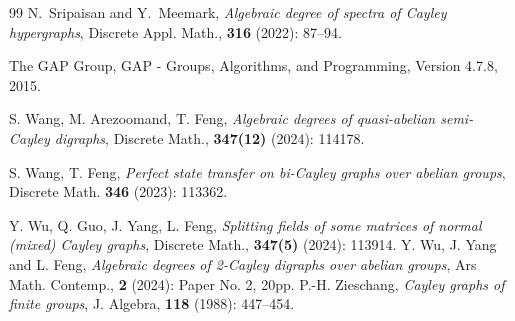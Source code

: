 \documentclass[12pt,a4paper]{article}
\begin{document}
\begin{thebibliography}{99}
		N.~Sripaisan and Y.~Meemark, {\it Algebraic degree of spectra of Cayley hypergraphs}, Discrete Appl. Math., {\bf 316} (2022): 87--94.
		
		
			The GAP Group, GAP - Groups, Algorithms, and Programming, Version 4.7.8, 2015.
		
		S. Wang, M. Arezoomand, T. Feng, {\it Algebraic degrees of quasi-abelian semi-Cayley digraphs}, Discrete Math., {\bf 347(12)} (2024): 114178.
		
			S. Wang, T. Feng, {\it Perfect state transfer on bi-Cayley graphs over abelian groups}, Discrete Math. {\bf 346} (2023): 113362.
		
		
		
		 Y. Wu, Q. Guo, J. Yang, L. Feng, {\it Splitting fields of some matrices of normal (mixed) Cayley graphs}, Discrete Math.,  {\bf 347(5)} (2024): 113914.
		Y. Wu, J. Yang and L. Feng, {\it Algebraic degrees of 2-Cayley digraphs over abelian groups}, Ars Math. Contemp., {\bf 2} (2024): Paper No. 2, 20pp.
		 P.-H. Zieschang, {\it Cayley graphs of finite groups}, J. Algebra, {\bf 118} (1988): 447--454.
		
	\end{thebibliography}
\end{document}
